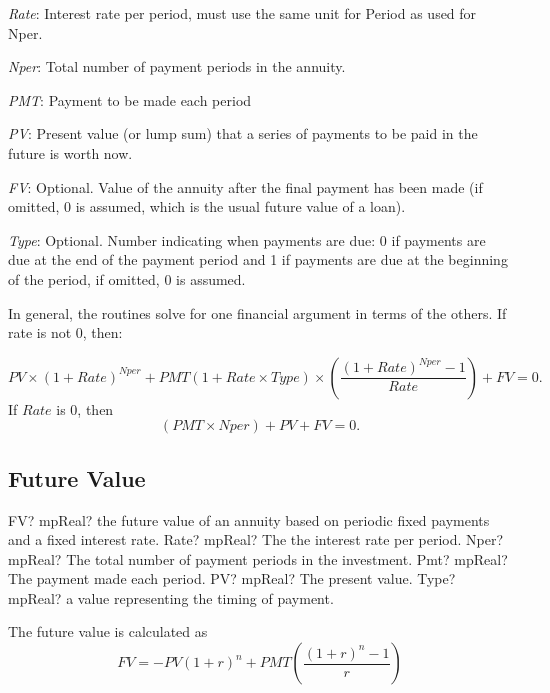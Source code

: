 \textit{Rate}: Interest rate per period, must use the same unit for Period as used for Nper.

\textit{Nper}: Total number of payment periods in the annuity.

\textit{PMT}: Payment to be made each period

\textit{PV}: Present value (or lump sum) that a series of payments to be paid in the future is worth now.

\textit{FV}: Optional. Value of the annuity after the final payment has been made (if omitted, 0 is assumed, which is the usual future value of a loan).

\textit{Type}: Optional. Number indicating when payments are due: 0 if payments are due at the end of the payment period and 1 if payments are due at the beginning of the period, if omitted, 0 is assumed.

In general, the routines solve for  one financial argument in terms of the others. If rate is not 0, then: 

\begin{equation}
PV \times (1+Rate)^{Nper} + PMT(1+Rate \times Type) \times \left(\frac{(1+Rate)^{Nper}-1}{Rate}\right)+FV=0.
\end{equation}
If $Rate$ is 0, then 
\begin{equation}
(PMT \times Nper) + PV + FV =0.
\end{equation}


\subsection{Future Value}

\begin{mpFunctionsExtract}
	\mpWorksheetFunctionFiveNotImplemented
	{FV? mpReal? the future value of an annuity based on periodic fixed payments and a fixed interest rate.}
	{Rate? mpReal? The the interest rate per period.}
	{Nper? mpReal? The total number of payment periods in the investment.}
	{Pmt? mpReal? The payment made each period.}
	{PV? mpReal? The present value.}
	{Type? mpReal? a value representing the timing of payment.}
\end{mpFunctionsExtract}

\vspace{0.3cm}
The future value is calculated as
\begin{equation}
FV = -PV(1+r)^n + PMT\left( \frac{(1+r)^n - 1}{r} \right)
\end{equation}





